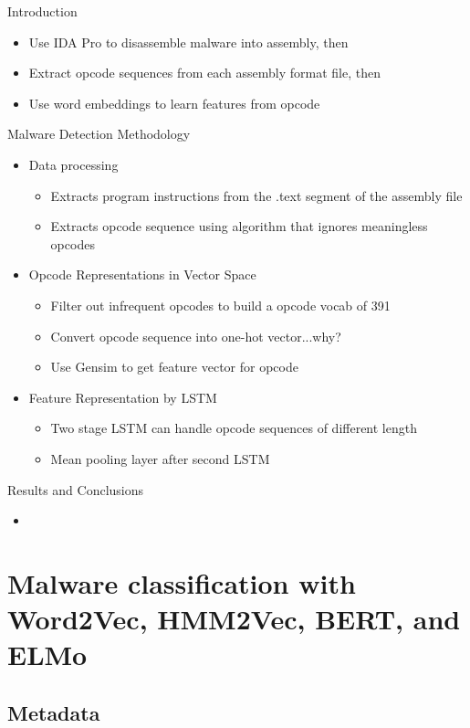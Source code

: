 \documentclass{article}
\begin{document}
Introduction
\begin{itemize}
\item Use IDA Pro to disassemble malware into assembly, then
\item Extract opcode sequences from each assembly format file, then
\item Use word embeddings to learn features from opcode
\end{itemize}
Malware Detection Methodology
\begin{itemize}
\item Data processing
	\begin{itemize}
	\item Extracts program instructions from the .text segment of the assembly file
	\item Extracts opcode sequence using algorithm that ignores meaningless opcodes
	\end{itemize}
\item Opcode Representations in Vector Space
	\begin{itemize}
	\item Filter out infrequent opcodes to build a opcode vocab of 391
	\item Convert opcode sequence into one-hot vector...why?
	\item Use Gensim to get feature vector for opcode
	\end{itemize}
\item Feature Representation by LSTM
	\begin{itemize}
	\item Two stage LSTM can handle opcode sequences of different length
	\item Mean pooling layer after second LSTM
	\end{itemize}
\end{itemize}
Results and Conclusions
\begin{itemize}
\item 
\end{itemize}

\pagebreak


\section*{Malware classification with Word2Vec, HMM2Vec, BERT, and ELMo}

\subsection*{Metadata}
\end{document}

